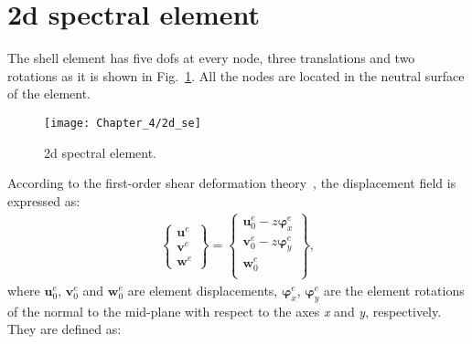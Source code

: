 \section{\acs{2d} spectral element}
\label{sec:2Dmodel}

The shell element has five \acp{dof} at every node, three translations and two rotations as it is shown in Fig.~\ref{fig:2d_se}.
All the nodes are located in the neutral surface of the element.
\begin{figure}
	\begin{center}
		\texttt{[image: Chapter\_4/2d\_se]}
	\end{center}
	\caption{\Acf{2d} spectral element.}
	\label{fig:2d_se}
\end{figure}
According to the first-order shear deformation theory~\cite{reissner1945effect, mindlin1951influence}, the displacement field is expressed as:
\begin{eqnarray}
	\left \{ \begin{array}{c}
		\textbf{u}^e\\
		\textbf{v}^e\\
		\textbf{w}^e
	\end{array} \right\} = 
	\left \{ \begin{array}{c}
		\textbf{u}_0^e - z\boldsymbol{\varphi}_x^e\\
		\textbf{v}_0^e - z\boldsymbol{\varphi}_y^e\\
		\textbf{w}_0^e\\
	\end{array} \right\},
\end{eqnarray}
%
%
where \(\textbf{u}_0^e\), \(\textbf{v}_0^e\) and \(\textbf{w}_0^e\) are element displacements, \(\boldsymbol{\varphi}_x^e\), \(\boldsymbol{\varphi}_y^e\) are the element rotations of the normal to the mid-plane with respect to the axes \textit{x} and \textit{y}, respectively. They are defined as:
